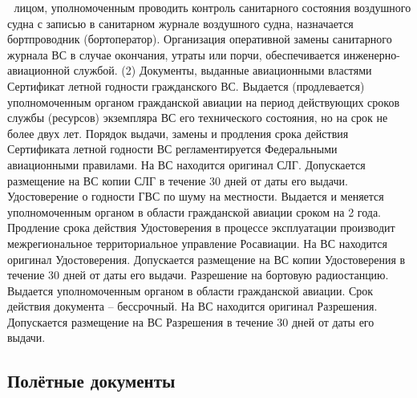 	лицом, уполномоченным проводить контроль санитарного состояния воздушного судна с записью в санитарном журнале воздушного судна, назначается бортпроводник (бортоператор). 
Организация оперативной замены санитарного журнала ВС в случае окончания, утраты или порчи, обеспечивается инженерно-авиационной службой.
           (2)  Документы, выданные авиационными властями Сертификат летной годности 
                                                                гражданского ВС.
Выдается (продлевается) уполномоченным органом гражданской авиации на период действующих сроков службы (ресурсов) экземпляра ВС его технического состояния, но на срок не более двух лет.
Порядок выдачи, замены и продления срока действия Сертификата летной годности ВС регламентируется Федеральными авиационными правилами. 
 На ВС находится оригинал СЛГ. Допускается размещение на ВС копии СЛГ в течение 30 дней от даты его выдачи.
Удостоверение о годности ГВС по шуму на местности.
Выдается и меняется уполномоченным органом в области гражданской авиации сроком на 2 года.
Продление срока действия Удостоверения в процессе эксплуатации производит межрегиональное территориальное управление Росавиации.
На ВС находится оригинал Удостоверения. Допускается размещение на ВС копии Удостоверения в течение 30 дней от даты его выдачи.
Разрешение на бортовую радиостанцию.
Выдается уполномоченным органом в области гражданской авиации. Срок действия документа – бессрочный. 
На ВС находится оригинал Разрешения. Допускается размещение на ВС Разрешения в течение 30 дней от даты его выдачи.

\subsection{Полётные документы}

